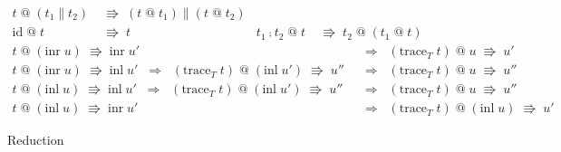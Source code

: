 \documentclass{jsarticle}
\newcommand{\reduct}[2]{#1 &\;\Rrightarrow\; #2}
\newcommand{\reduction}[2]{#1 \;\Rrightarrow\; #2}
\begin{document}
\begin{figure}[H]
\begin{align*}
    \reduct{t\;\text{@}\;(t_1\parallel{}t_2)}{(t\;\text{@}\;t_1)\parallel(t\;\text{@}\;t_2)} \\
    \reduct{\text{id}\;\text{@}\;t}{t} &
    \reduct{t_1\fcmp{}t_2\;\text{@}\;t}{t_2\;\text{@}\;(t_1\;\text{@}\;t)}
  \end{align*}
  \begin{align*}
    \reduction{t\;\text{@}\;(\text{inr}\;u)}{\text{inr}\;u'} &\;\;\Longrightarrow\;\; \reduction{(\text{trace}_T\;t)\;\text{@}\;u}{u'} \\
    \reduction{t\;\text{@}\;(\text{inr}\;u)}{\text{inl}\;u'} \;\;\Longrightarrow\;\; \reduction{(\text{trace}_T\;t)\;\text{@}\;(\text{inl}\;u')}{u''} &\;\;\Longrightarrow\;\; \reduction{(\text{trace}_T\;t)\;\text{@}\;u}{u''} \\
    \reduction{t\;\text{@}\;(\text{inl}\;u)}{\text{inl}\;u'} \;\;\Longrightarrow\;\; \reduction{(\text{trace}_T\;t)\;\text{@}\;(\text{inl}\;u')}{u''} &\;\;\Longrightarrow\;\; \reduction{(\text{trace}_T\;t)\;\text{@}\;u}{u''} \\
    \reduction{t\;\text{@}\;(\text{inl}\;u)}{\text{inr}\;u'} &\;\;\Longrightarrow\;\; \reduction{(\text{trace}_T\;t)\;\text{@}\;(\text{inl}\;u)}{u'}
  \end{align*}
  \caption{Reduction}
  \label{fig:reduction}
\end{figure}

\end{document}

